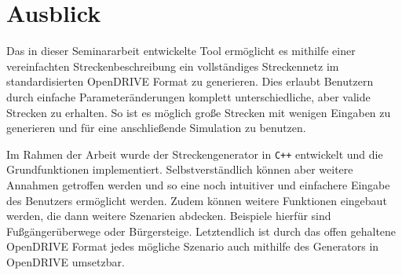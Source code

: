 \chapter{Ausblick}

Das in dieser Seminararbeit entwickelte Tool ermöglicht es mithilfe einer vereinfachten Streckenbeschreibung ein vollständiges Streckennetz im standardisierten OpenDRIVE Format zu generieren. Dies erlaubt Benutzern durch einfache Parameteränderungen komplett unterschiedliche, aber valide Strecken zu erhalten. So ist es möglich große Strecken mit wenigen Eingaben zu generieren und für eine anschließende Simulation zu benutzen.

Im Rahmen der Arbeit wurde der Streckengenerator in \texttt{C++} entwickelt und die Grundfunktionen implementiert. Selbstverständlich können aber weitere Annahmen getroffen werden und so eine noch intuitiver und einfachere Eingabe des Benutzers ermöglicht werden. Zudem können weitere Funktionen eingebaut werden, die dann weitere Szenarien abdecken. Beispiele hierfür sind Fußgängerüberwege oder Bürgersteige. Letztendlich ist durch das offen gehaltene OpenDRIVE Format jedes mögliche Szenario auch mithilfe des Generators in OpenDRIVE umsetzbar.

